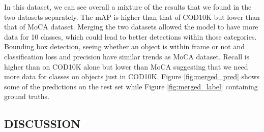\documentclass[conference]{IEEEtran}
\begin{document}
In this dataset, we can see overall a mixture of the results that we found in the two datasets separately. The mAP is higher than that of COD10K but lower than that of MoCA dataset. Merging the two datasets allowed the model to have more data for 10 classes, which could lead to better detections within those categories. Bounding box detection, seeing whether an object is within frame or not and classification loss and precision have similar trends as MoCA dataset. Recall is higher than on COD10K alone but lower than MoCA suggesting that we need more data for classes on objects just in COD10K. Figure \ref{fig:merged_pred} shows some of the predictions on the test set while Figure \ref{fig:merged_label} containing ground truths. 
\newpage
\subsection{DISCUSSION}

\begin{table}[ht]
\centering
{}
\caption{Summary of the Performance of the YOLOv5s Model}
\label{tab:my-table3}
\end{table}
\end{document}
